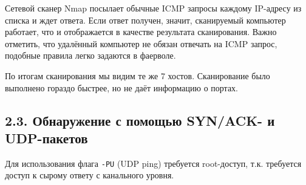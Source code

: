 Сетевой сканер Nmap посылает обычные ICMP запросы каждому IP-адресу из списка и ждет ответа. Если ответ получен, значит, сканируемый компьютер работает, что и отображается в качестве результата сканирования. Важно отметить, что удалённый компьютер не обязан отвечать на ICMP запрос, подобные правила легко задаются в фаерволе.

По итогам сканирования мы видим те же 7 хостов. Сканирование было выполнено гораздо быстрее, но не даёт информацию о портах.

\subsection*{2.3. Обнаружение с помощью SYN/ACK- и UDP-пакетов}

Для использования флага \texttt{-PU} (UDP ping) требуется root-доступ, т.к. требуется доступ к сырому ответу с канального уровня.

